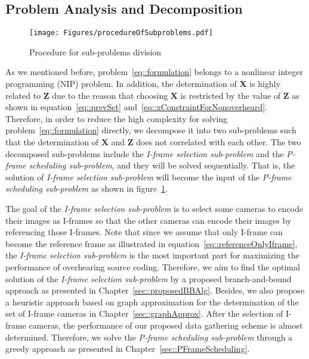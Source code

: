 \subsection{Problem Analysis and Decomposition}
\begin{figure}
\begin{center}
\texttt{[image: Figures/procedureOfSubproblems.pdf]}
\caption{\label{fig::subProbProcedure}Procedure for sub-problems division}
\end{center}
\end{figure}
As we mentioned before, problem~\eqref{eq::formulation} belongs to a nonlinear integer programming (NIP) problem.
In addition, the determination of $\mathbf{X}$ is highly related to $\mathbf{Z}$ due to the reason that choosing $\mathbf{X}$ is restricted by the value of $\mathbf{Z}$ as shown in equation~\eqref{eq::prevSet} and~\eqref{eq::xConstraintForNonoverheard}.
Therefore, in order to reduce the high complexity for solving problem~\eqref{eq::formulation} directly, we decompose it into two sub-problems such that the determination of $\mathbf{X}$ and $\mathbf{Z}$ does not correlated with each other. The two decomposed sub-problems include the \emph{I-frame selection sub-problem} and the \emph{P-frame scheduling sub-problem}, and they will be solved sequentially.
That is, the solution of \emph{I-frame selection sub-problem} will become the input of the \emph{P-frame scheduling sub-problem} as shown in figure~\ref{fig::subProbProcedure}.

The goal of the \emph{I-frame selection sub-problem} is to select some cameras to encode their images as I-frames so that the other cameras can encode their images by referencing those I-frames.
Note that since we assume that only I-frame can become the reference frame as illustrated in equation~\eqref{eq::referenceOnlyIframe}, the \emph{I-frame selection sub-problem} is the most important part for maximizing the performance of overhearing source coding.
Therefore, we aim to find the optimal solution of the \emph{I-frame selection sub-problem} by a proposed branch-and-bound approach as presented in Chapter~\ref{sec::proposedBBAlg}.
Besides, we also propose a heuristic approach based on graph approximation for the determination of the set of I-frame cameras in Chapter~\ref{sec::graphApprox}.
After the selection of I-frame cameras, the performance of our proposed data gathering scheme is almost determined.
Therefore, we solve the \emph{P-frame scheduling sub-problem} through a greedy approach as presented in Chapter~\ref{sec::PFrameScheduling}.